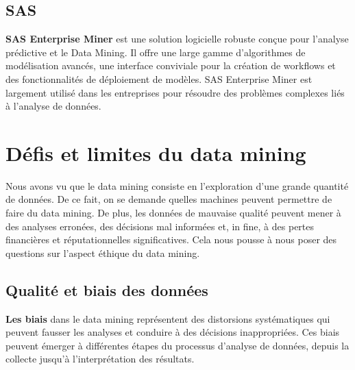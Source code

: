 \documentclass[a4paper,12pt]{report}
\begin{document}
    \section{SAS}
    \textbf{SAS Enterprise Miner} est une solution logicielle robuste conçue pour l’analyse prédictive et le Data Mining. Il offre une large gamme d’algorithmes de modélisation avancés, une interface conviviale pour la création de workflows et des fonctionnalités de déploiement de modèles. SAS Enterprise Miner est largement utilisé dans les entreprises pour résoudre des problèmes complexes liés à l’analyse de données.



\chapter{Défis et limites du data mining}
	Nous avons vu que le data mining consiste en l’exploration d’une grande quantité de données. De ce fait, on se demande quelles machines peuvent permettre de faire du data mining. De plus, les données de mauvaise qualité peuvent mener à des analyses erronées, des décisions mal informées et, in fine, à des pertes financières et réputationnelles significatives. Cela nous pousse à nous poser des questions sur l’aspect éthique du data mining. 

	\section{Qualité et biais des données}
	    \textbf{Les biais} dans le data mining représentent des distorsions systématiques qui peuvent fausser les analyses et conduire à des décisions inappropriées. Ces biais peuvent émerger à différentes étapes du processus d'analyse de données, depuis la collecte jusqu'à l'interprétation des résultats.
\end{document}
